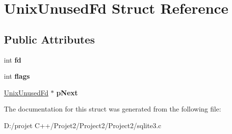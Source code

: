 \hypertarget{struct_unix_unused_fd}{}\section{Unix\+Unused\+Fd Struct Reference}
\label{struct_unix_unused_fd}
\subsection*{Public Attributes}
\begin{DoxyCompactItemize}
\item 
\mbox{\label{struct_unix_unused_fd_a3f1a6127218af971aeb7b131c9c1600d}} 
int {\bfseries fd}
\item 
\mbox{\label{struct_unix_unused_fd_a744cd118bd91ec2019108e8205708684}} 
int {\bfseries flags}
\item 
\mbox{\label{struct_unix_unused_fd_a6bbcba75beeabdd2df126638bc1d8bc0}} 
\mbox{\hyperlink{struct_unix_unused_fd}{Unix\+Unused\+Fd}} $\ast$ {\bfseries p\+Next}
\end{DoxyCompactItemize}


The documentation for this struct was generated from the following file\+:\begin{DoxyCompactItemize}
\item 
D\+:/projet C++/\+Projet2/\+Project2/\+Project2/sqlite3.\+c\end{DoxyCompactItemize}
